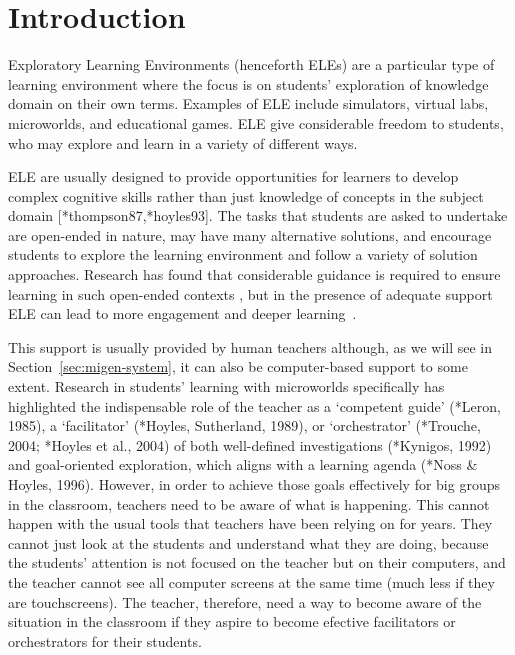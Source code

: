 \section{Introduction}
\label{sec:introduction}

Exploratory Learning Environments (henceforth ELEs) are a particular
type of learning environment where the focus is on students'
exploration of knowledge domain on their own terms. Examples of ELE
include simulators, virtual labs, microworlds, and educational
games. ELE give considerable freedom to students, who may explore and
learn in a variety of different ways.

ELE are usually designed to provide opportunities for learners to
develop complex cognitive skills rather than just knowledge of concepts in the subject
domain [*thompson87,*hoyles93]. The tasks that students are asked to
undertake are open-ended in nature, may have many alternative
solutions, and encourage students to explore the learning
environment and follow a variety of solution approaches. Research
has found that considerable guidance is required to ensure learning in
such open-ended contexts \cite{kirschner06,Noss96,Kynigos92,MayerDiscovery},
but in the presence of adequate support ELE can lead to more engagement
and deeper learning~\cite{deeperLearning}. 

This support is usually provided by human teachers although, as we
will see in Section~\ref{sec:migen-system}, it can also be
computer-based support to some extent.
Research in students’ learning with microworlds specifically has highlighted
the indispensable role of the teacher as a ‘competent guide’ (*Leron,
1985), a ‘facilitator’ (*Hoyles, Sutherland, 1989), or ‘orchestrator’
(*Trouche, 2004; *Hoyles et al., 2004) of both well-defined
investigations (*Kynigos, 1992) and goal-oriented exploration, which
aligns with a learning agenda (*Noss \& Hoyles, 1996). However, in
order to achieve those goals effectively for big groups in the
classroom, teachers need to be aware of what is happening. This cannot
happen with the usual tools that teachers have been relying on for
years. They cannot just look at the students and understand what they
are doing, because the students' attention is not focused on the
teacher but on their computers, and the teacher cannot see all
computer screens at the same time (much less if they are
touchscreens). The teacher, therefore, need a way to become aware of
the situation in the classroom if they aspire to become efective
facilitators or orchestrators for their students. 

